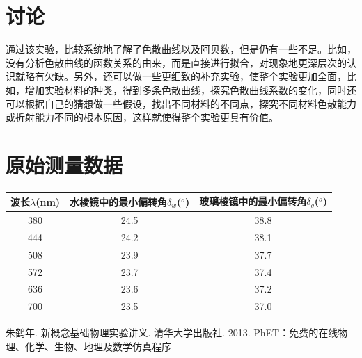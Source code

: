 \documentclass[UTF8]{ctexart}
\begin{document}
\section{讨论}
通过该实验，比较系统地了解了色散曲线以及阿贝数，但是仍有一些不足。比如，没有分析色散曲线的函数关系的由来，而是直接进行拟合，对现象地更深层次的认识就略有欠缺。另外，还可以做一些更细致的补充实验，使整个实验更加全面，比如，增加实验材料的种类，得到多条色散曲线，探究色散曲线系数的变化，同时还可以根据自己的猜想做一些假设，找出不同材料的不同点，探究不同材料色散能力或折射能力不同的根本原因，这样就使得整个实验更具有价值。

\section{原始测量数据}
\begin{table}[htbp!] 
\centering 
\begin{tabular}{|c|c|c|} 
\hline 
波长$\lambda$(nm) &  水棱镜中的最小偏转角$\delta_w$($^o$) &玻璃棱镜中的最小偏转角$\delta_g$($^o$) \\ 
\hline 
380 & 24.5 &38.8\\ 
\hline 
444 & 24.2 &38.1\\ 
\hline 
508 & 23.9  &37.7\\ 
\hline 
572 & 23.7  &37.4\\ 
\hline 
636 & 23.6  &37.2\\ 
\hline 
700 & 23.5 &37.0 \\ 
\hline
\end{tabular} 
\end{table}

\begin{thebibliography}{123456} 
 朱鹤年. 新概念基础物理实验讲义. 清华大学出版社. 2013. 
 PhET：免费的在线物理、化学、生物、地理及数学仿真程序
\end{thebibliography}
\end{document}
